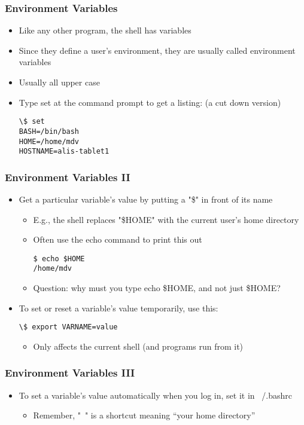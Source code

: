 \begin{frame}[fragile]\frametitle{Environment Variables}
\begin{itemize}
\item Like any other program, the shell has variables
\item Since they define a user's environment, they are usually called environment variables
\item Usually all upper case
\item Type set at the command prompt to get a listing: (a cut down version)\\
\codelist
\begin{lstlisting}[linewidth=7cm]
\$ set
BASH=/bin/bash
HOME=/home/mdv
HOSTNAME=alis-tablet1
\end{lstlisting}
\end{itemize}
\end{frame}

\begin{frame}[fragile]\frametitle{Environment Variables II}
\begin{itemize}
\item Get a particular variable's value by putting a "\$" in front of its name
\begin{itemize}
\item E.g., the shell replaces "\$HOME" with the current user's home directory
\item Often use the echo command to print this out
\codelist
\begin{lstlisting}[linewidth=5cm]
$ echo $HOME
/home/mdv
\end{lstlisting}
\item Question: why must you type echo \$HOME, and not just \$HOME?
\end{itemize}
\item To set or reset a variable's value temporarily, use this:
\codelist
\begin{lstlisting}[linewidth=5cm]
\$ export VARNAME=value
\end{lstlisting}
\begin{itemize}
    \item Only affects the current shell (and programs run from it)
\end{itemize}
\end{itemize}
\end{frame}

\begin{frame}\frametitle{Environment Variables III}
\begin{itemize}
\item To set a variable's value automatically when you log in, set it in ~/.bashrc
\begin{itemize}
    \item Remember, "~" is a shortcut meaning “your home directory”
\end{itemize}
\end{itemize}
\end{frame}

